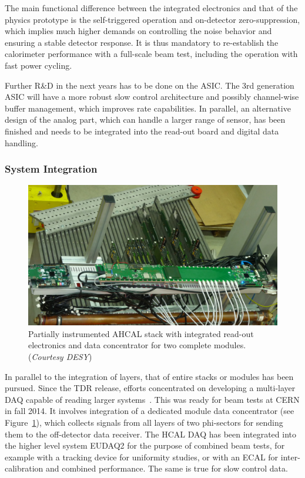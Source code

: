 The main functional difference between the integrated electronics and that of the physics prototype is the self-triggered operation and on-detector zero-suppression, which implies much higher demands on controlling the noise behavior and ensuring a stable detector response. It is thus mandatory to re-establish the calorimeter performance with a full-scale beam test, including the operation with fast power cycling.

Further R\&D in the next years has to be done on the ASIC. The 3rd generation ASIC will have a more robust slow control architecture and possibly channel-wise buffer management, which improves rate capabilities. In parallel, an alternative design of the analog part, which can handle a larger range of sensor, has been finished and needs to be integrated into the read-out board and digital data handling.

\subsubsection{System Integration}

\begin{figure}
	\centering
	\includegraphics[width=.5\textwidth]{Calorimeter/AHCAL/AHCAL_Stack}
	\caption{Partially instrumented AHCAL stack with integrated read-out electronics and data concentrator for two complete modules.({\it Courtesy DESY})}
	\label{fig:Calorimeter:AHCAL:Stack}
\end{figure}

In parallel to the integration of layers, that of entire stacks or modules has been pursued. Since the TDR release, efforts concentrated on developing a multi-layer DAQ capable of reading larger systems~\cite{Kvasnicka:2017bpx}. This was ready for beam tests at CERN in fall 2014. It involves integration of a dedicated module data concentrator (see Figure~\ref{fig:Calorimeter:AHCAL:Stack}), which collects signals from all layers of two phi-sectors for sending them to the off-detector data receiver. The HCAL DAQ has been integrated into the higher level system EUDAQ2 for the purpose of combined beam tests, for example with a tracking device for uniformity studies, or with an ECAL for inter-calibration and combined performance. The same is true for slow control data.

